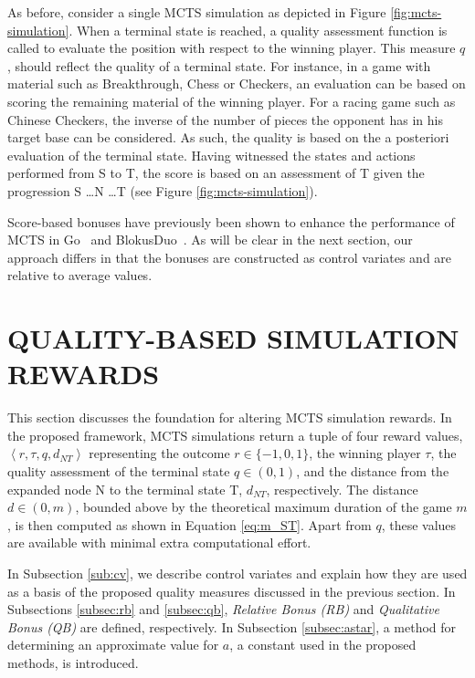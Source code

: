 \documentclass{ecai2014}
\newcommand{\tuple}[1]{\ensuremath{\left \langle #1 \right \rangle }}
\newcommand{\node}[1]{{\fontfamily{phv}\selectfont#1}}
\begin{document}
As before, consider a single MCTS simulation as depicted in Figure \ref{fig:mcts-simulation}. When a terminal state is reached, a quality assessment function is called to evaluate the position with respect to the winning player. This measure $q$, should reflect the quality of a terminal state. For instance, in a game with material such as Breakthrough, Chess or Checkers, an evaluation can be based on scoring the remaining material of the winning player. For a racing game such as Chinese Checkers, the inverse of the number of pieces the opponent has in his target base can be considered. As such, the quality is based on the a posteriori evaluation of the terminal state. Having witnessed the states and actions performed from \node{S} to \node{T}, the score is based on an assessment of \node{T} given the progression \node{S} \ldots \node{N} \ldots \node{T} (see Figure \ref{fig:mcts-simulation}).

Score-based bonuses have previously been shown to enhance the performance of MCTS in Go~\cite{Enzenberger10Fuego} and  BlokusDuo~\cite{shibahara2008combining}. As will be clear in the next section, our approach differs in that the bonuses are constructed as control variates and are relative to average values. 

\section{QUALITY-BASED SIMULATION REWARDS}
\label{sec:qoreward}
This section discusses the foundation for altering MCTS simulation rewards. In the proposed framework, MCTS simulations return a tuple of four reward values, $\tuple{r,\tau,q,d_{NT}}$ representing the outcome $r\in\{-1, 0, 1\}$, the winning player $\tau$, the quality assessment of the terminal state $q\in(0, 1)$, and the distance from the expanded node \node{N} to the terminal state \node{T}, $d_{NT}$, respectively. The distance $d\in(0, m)$, bounded above by the theoretical maximum duration of the game $m$, is then computed as shown in Equation \ref{eq:m_ST}. Apart from $q$, these values are available with minimal extra computational effort.

In Subsection \ref{sub:cv}, we describe control variates and explain how they are used as a basis of the proposed quality measures discussed in the previous section. In Subsections \ref{subsec:rb} and \ref{subsec:qb}, \emph{Relative Bonus (RB)} and \emph{Qualitative Bonus (QB)} are defined, respectively. In Subsection \ref{subsec:astar}, a method for determining an approximate value for $a$, a constant used in the proposed methods, is introduced.
\end{document}
